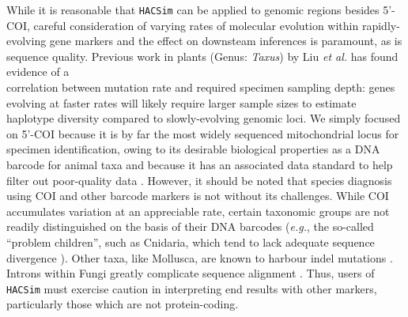 While it is reasonable that {\tt HACSim} can be applied to genomic regions besides 5'-COI, careful consideration of varying rates of molecular evolution within rapidly-evolving gene markers and the effect on downsteam inferences is paramount, as is sequence quality. Previous work in plants (Genus: \textit{Taxus}) by Liu \textit{et al.} \cite{liu2012sampling} has found evidence of a \\ correlation between mutation rate and required specimen sampling depth: genes evolving at faster rates will likely require larger sample sizes to estimate haplotype diversity compared to slowly-evolving genomic loci. We simply focused on 5'-COI because it is by far the most widely sequenced mitochondrial locus for specimen identification, owing to its desirable biological properties as a DNA barcode for animal taxa and because it has an associated data standard to help filter out poor-quality data \cite{phillips2019incomplete}. However, it should be noted that species diagnosis using COI and other barcode markers is not without its challenges. While COI accumulates variation at an appreciable rate, certain taxonomic groups are not readily distinguished on the basis of their DNA barcodes (\textit{e.g.}, the so-called ``problem children'', such as Cnidaria, which tend to lack adequate sequence divergence \cite{bucklin2011dna}). Other taxa, like Mollusca, are known to harbour indel mutations \cite{layton2014patterns}. Introns within Fungi greatly complicate sequence alignment \cite{min2007assessing}. Thus, users of {\tt HACSim} must exercise caution in interpreting end results with other markers, particularly those which are not protein-coding.



